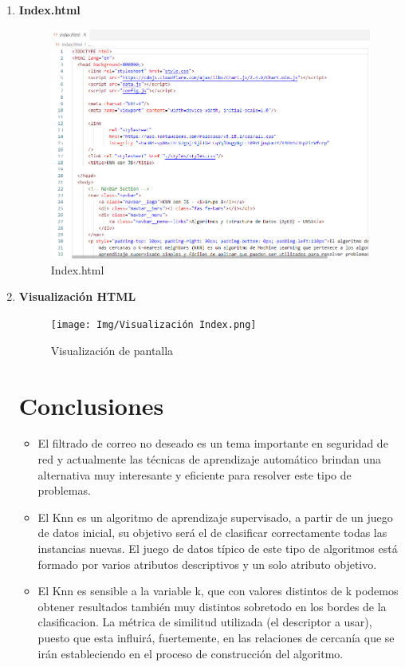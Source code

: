 \documentclass{article}
\begin{document}
\begin{enumerate}
\item \textbf{Index.html}

\begin{figure}[H]
\centering
\includegraphics[width=1.1\textwidth]{Img/Index.png}
\caption{Index.html}
\end{figure}

\item \textbf{Visualización HTML}

\begin{figure}[H]
\centering
\texttt{[image: Img/Visualización Index.png]}
\caption{Visualización de pantalla}
\end{figure}

\section{Conclusiones}

\begin{itemize}
   \item El  filtrado  de  correo  no deseado  es  un  tema  importante  en  seguridad  de  red y  actualmente  las  técnicas  de aprendizaje automático brindan una alternativa muy interesante y eficiente para resolver este tipo de problemas.
   \item El Knn es un algoritmo de aprendizaje supervisado, a partir de un juego de datos inicial, su objetivo será el de clasificar correctamente todas las instancias nuevas. El juego de datos típico de este tipo de algoritmos está formado por varios atributos descriptivos y un solo atributo objetivo.
   \item El Knn es sensible a la variable k, que con valores distintos de k podemos obtener resultados también muy distintos sobretodo en los bordes de la clasificacion. La métrica de similitud utilizada (el descriptor a usar), puesto que esta influirá, fuertemente, en las relaciones de cercanía que se irán estableciendo en el proceso de construcción del algoritmo.

\end{itemize}

    

    \end{enumerate}
	
		
	
\end{document}
